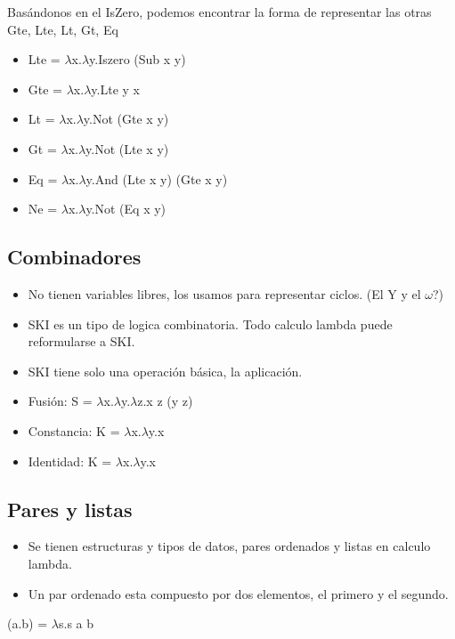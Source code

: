 Basándonos en el IsZero, podemos encontrar la forma de representar las otras Gte, Lte, Lt, Gt, Eq

\begin{itemize}
\item Lte = $\lambda$x.$\lambda$y.Iszero (Sub x y)
\item Gte = $\lambda$x.$\lambda$y.Lte y x
\item Lt = $\lambda$x.$\lambda$y.Not (Gte x y) 
\item Gt = $\lambda$x.$\lambda$y.Not (Lte x y) 
\item Eq = $\lambda$x.$\lambda$y.And (Lte x y) (Gte x y)
\item Ne = $\lambda$x.$\lambda$y.Not (Eq x y)
\end{itemize}

\subsection*{Combinadores}
\begin{itemize}
\item No tienen variables libres, los usamos para representar ciclos. (El Y y el $\omega$?)
\item SKI es un tipo de logica combinatoria. Todo calculo lambda puede reformularse a SKI. 
\item SKI tiene solo una operación básica, la aplicación.
\item Fusión: S = $\lambda$x.$\lambda$y.$\lambda$z.x z (y z)
\item Constancia: K = $\lambda$x.$\lambda$y.x 
\item Identidad: K = $\lambda$x.$\lambda$y.x 
\end{itemize}


\subsection*{Pares y listas}

\begin{itemize}
\item Se tienen estructuras y tipos de datos, pares ordenados y listas en calculo lambda.
\item Un par ordenado esta compuesto por dos elementos, el primero y el segundo.
\end{itemize}

\begin{center}
(a.b) = $\lambda$s.s a b
\end{center}


